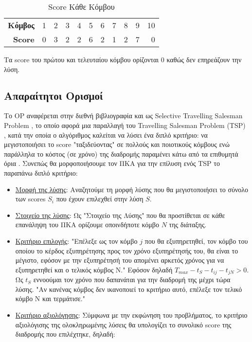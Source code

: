 \documentclass[12pt, a4paper]{article}
\begin{document}
\begin{table}[H]
\centering
\label{my-label}
\begin{tabular}{r|r|r|r|r|r|r|r|r|r|r|}
\cline{2-11}
\textbf{Κόμβος}  & 1 & 2 & 3 & 4 & 5 & 6 & 7 & 8 & 9 & 10 \\ \cline{2-11} 
\textbf{Score} & 0 & 3 & 2 & 2 & 6 & 2 & 1 & 2 & 7 & 0  \\ \cline{2-11} 
\end{tabular}
\caption{Score Κάθε Κόμβου}
\end{table}

Τα score του πρώτου και τελευταίου κόμβου ορίζονται 0 καθώς δεν επηρεάζουν την λύση.

\subsection{Απαραίτητοι Ορισμοί}
Το OP αναφέρεται στην διεθνή βιβλιογραφία και ως Selective Travelling Salesman Problem \cite{feillet2005traveling}, το οποίο αφορά μια παραλλαγή του Travelling Salesman Problem (TSP) \cite{Lecture2}, κατά την οποία ο αλγόριθμος καλείται να λύσει ένα διπλό κριτήριο: να μεγιστοποιήσει το score "ταξιδεύοντας" σε πολλούς και ποιοτικούς κόμβους ενώ παράλληλα το κόστος (σε χρόνο) της διαδρομής παραμένει κάτω από τα επιθυμητά όρια \cite{feillet2005traveling}. Συνεπώς θα μορφοποιήσουμε τον ΠΚΑ για την επίλυση ενός TSP το παραπάνω διπλό κριτήριο:

\begin{itemize}

\item \underline{Μορφή της λύσης}: Αναζητούμε τη μορφή λύσης που θα μεγιστοποιήσει το σύνολο των scores \(S_i\) που έχουν επιλεχθεί στην λύση \(S\).
\item \underline{Στοιχείο της λύσης}: Ως "Στοιχείο της Λύσης" που θα προστίθεται σε κάθε επανάληψη του ΠΚΑ ορίζουμε οποινδήποτε κόμβο \(N\) της διάταξης.
\item \underline{Κριτήριο επιλογής}: "Επέλεξε ως τον κόμβο \(j\) που θα εξυπηρετηθεί, τον κόμβο του οποίου το κέρδος εξυπηρέτησης προς τον χρόνο εξυπηρέτησής του, θα είναι το μέγιστο, εφόσον με την εξυπηρέτησή του απομένει αρκετός χρόνος για να εξυπηρετηθεί και ο τελικός κόμβος N." Εφόσον δηλαδή \( T_{max} - t_{S} - t_{ij} - t_{jN} > 0\).  Ως \(t_{S}\) εννοούμαι τον χρόνο που δαπανάται για την διαδρομή της μέχρι τώρα λύσης. "Αν κανένας κόμβος δεν ικανοποιεί το κριτήριο αυτό, επέλεξε τον τελικό κόμβο N και τερμάτισε."
\item \underline{Κριτήριο αξιολόγησης}: Σύμφωνα με την εκφώνηση του προβλήματος, το κριτήριο αξιολόγισης της ολοκληρωμένης λύσεις θα υπολογίζει το συνολικό score της διαδρομής που επιλέχτηκε, δηλαδή:

\end{itemize}
\end{document}
